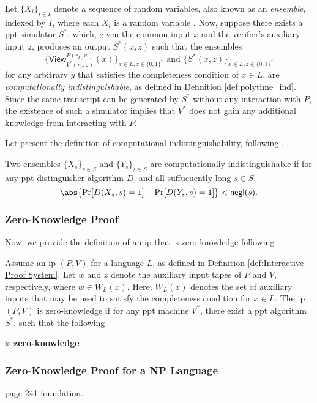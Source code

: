 Let $\{X_i\}_{i \in I}$ denote a sequence of random variables, also known as an \textit{ensemble}, indexed by $I$, where each $X_i$ is a random variable \cite{Goldreich2001Book}. Now, suppose there exists a \gls{ppt} simulator $S^*$, which, given the common input $x$ and the verifier's auxiliary input $z$, produces an output $S^*(x, z)$ such that the ensembles  
\[
\{\textsf{View}_{V^*(r_V, z)}^{P(r_P, w)}(x)\}_{x\in L, z \in \{0,1\}^*} \text{ and } \{S^*(x, z)\}_{x\in L, z \in \{0,1\}^*}
\]  
for any arbitrary $y$ that satisfies the completeness condition of $x\in L$, are \textit{computationally indistinguishable}, as defined in Definition \ref{def:polytime_ind}. Since the same transcript can be generated by $S^*$ without any interaction with $P$, the existence of such a simulator implies that $V^*$ does not gain any additional knowledge from interacting with $P$.

Let present the definition of computational indistinguishability, following \cite{Goldreich2001Book}.
\begin{definition}\label{def:polytime_ind}	
Two ensembles $\{X_s\}_{s\in S}$ and $\{Y_s\}_{s\in S}$ are  computationally indistinguishable if for any \gls{ppt} distinguisher algorithm $D$, and all suffucuently long $s \in S$,
\[
\abs{\Pr[D(X_s, s) = 1] - \Pr[D(Y_s, s) = 1]} < \mathsf{negl}(s).
\]
\end{definition}


\subsubsection{Zero-Knowledge Proof}
Now, we provide the definition of an \gls{ip} that is zero-knowledge following~\cite{Goldreich2001Book}.
\begin{definition}\label{def:zk-proerty}	Assume an \gls{ip} $(P, V)$ for a language $L$, as defined in Definition \ref{def:Interactive Proof System}. Let $w$ and $z$ denote the auxiliary input tapes of $P$ and $V$, respectively, where $w \in W_L(x)$. Here, $W_L(x)$ denotes the set of auxiliary inputs that may be used to satisfy the completeness condition for $x \in L$.  The \gls{ip} $(P, V)$  is zero-knowledge if for any \gls{ppt} machine $V^*$, there exist a  \gls{ppt} algorithm $S^*$, such that the following 
	
	
	is \textbf{zero-knowledge} 
\end{definition}

\subsubsection{Zero-Knowledge Proof for a NP Language }
page 241 foundation.


